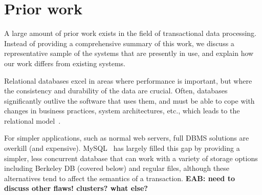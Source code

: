 \documentclass[letterpaper,twocolumn,english]{article}
\newcommand{\yad}{Lemon\xspace}
\newcommand{\eab}[1]{{\bf EAB: #1}}
\begin{document}
\section{Prior work}

A large amount of prior work exists in the field of transactional data
processing.  Instead of providing a comprehensive summary of this
work, we discuss a representative sample of the systems that are
presently in use, and explain how our work differs from existing
systems.




Relational databases excel in areas
where performance is important, but where the consistency and
durability of the data are crucial.  Often, databases significantly
outlive the software that uses them, and must be able to cope with
changes in business practices, system architectures,
etc., which leads to the relational model~\cite{relational}.

For simpler applications, such as normal web servers, full DBMS
solutions are overkill (and expensive).  MySQL~\cite{mysql} has
largely filled this gap by providing a simpler, less concurrent
database that can work with a variety of storage options including
Berkeley DB (covered below) and regular files, although these
alternatives tend to affect the semantics of a transaction.  \eab{need
to discuss other flaws! clusters? what else?}

\end{document}
